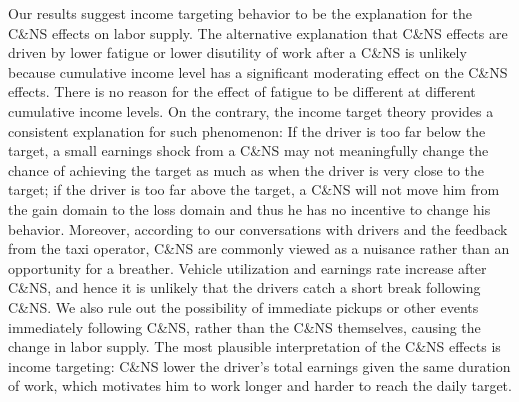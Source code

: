 \documentclass[reviewmode]{restat}
\begin{document}
Our results suggest income targeting behavior to be the explanation
for the C\&NS effects on labor supply. The alternative explanation that C\&NS effects are driven by lower
fatigue or lower disutility of work after a C\&NS is unlikely because cumulative income level has a significant 
moderating effect on the C\&NS effects. There is no reason for the effect of fatigue to be different at 
different cumulative income levels. On the contrary, the income target theory provides a consistent explanation
for such phenomenon: If the driver is too far below the target, a small earnings shock from a C\&NS may not
meaningfully change the chance of achieving the target as much as when the driver is very close to the target; 
if the driver is too far above the target, a C\&NS will not move him from the gain domain to the loss domain
and thus he has no incentive to change his behavior. Moreover, according to our conversations with drivers 
and the feedback from the taxi operator, C\&NS are commonly viewed as a nuisance rather than an opportunity
for a breather. Vehicle utilization and earnings rate increase after C\&NS, and hence it is unlikely that
the drivers catch a short break following C\&NS. We also rule out the possibility of immediate pickups or
other events immediately following C\&NS, rather than the C\&NS themselves, causing the change in labor 
supply. The most plausible interpretation of the C\&NS effects is income targeting: C\&NS lower the 
driver's total earnings given the same duration of work, which motivates him to work longer and harder
to reach the daily target. 
\end{document}
